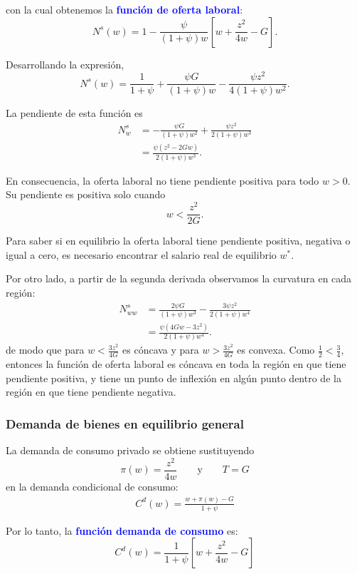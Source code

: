\documentclass[11pt]{article}
\begin{document}
con la cual obtenemos la \textcolor{blue}{\textbf{función de oferta laboral}}:
\begin{equation}
  \boxed{N^s(w) = 
  1 - 
\frac{\psi}{(1+\psi)w}\left[w+\dfrac{z^2}{4w}-G \right]}.
\end{equation}

Desarrollando la expresión,
\[
\boxed{
N^s(w)
=
\frac{1}{1+\psi}
+\frac{\psi G}{(1+\psi)w}
-\frac{\psi z^2}{4(1+\psi)w^2}
}.
\]

La pendiente de esta función es
\begin{align*}
N^s_w
&=
-\frac{\psi G}{(1+\psi)w^2}
+\frac{\psi z^2}{2(1+\psi)w^3}\\[0.3cm]
&=
\frac{\psi(z^2-2Gw)}
     {2(1+\psi)w^3}
.
\end{align*}

En consecuencia, la oferta laboral no tiene pendiente positiva para
todo \(w>0\). Su pendiente es positiva solo cuando
\[
w<\frac{z^2}{2G}.
\]

Para saber si en equilibrio la oferta laboral tiene pendiente positiva, negativa o igual a cero, es necesario encontrar el salario real de equilibrio $w^*$.

Por otro lado, a partir de la segunda derivada observamos la curvatura en cada región:
\begin{align*}
N^s_{ww}
&=
\frac{2\psi G}{(1+\psi)w^3}
-\frac{3\psi z^2}{2(1+\psi)w^4}\\[0.3cm]
&=
\frac{\psi(4Gw - 3z^2)}
     {2(1+\psi)w^4}.
\end{align*}
de modo que para $w < \tfrac{3z^2}{4G}$ es cóncava y para $w > \tfrac{3z^2}{4G}$ es convexa. Como $\tfrac{1}{2} < \tfrac{3}{4}$, entonces la función de oferta laboral es cóncava en toda la región en que tiene pendiente positiva, y tiene un punto de inflexión en algún punto dentro de la región en que tiene pendiente negativa.

\subsubsection*{Demanda de bienes en equilibrio general}

La demanda de consumo privado se obtiene sustituyendo
\[
\pi(w)=\frac{z^2}{4w}
\qquad\text{y}\qquad
T=G
\]
en la demanda condicional de consumo:
\begin{align*}
C^d(w) =
\frac{w+\pi(w)-G}{1+\psi}
\end{align*}

Por lo tanto, la \textcolor{blue}{\textbf{función demanda de consumo}} es: 
\begin{equation}
  \boxed{C^d(w) = \frac{1}{1+\psi} \left[w+\dfrac{z^2}{4w}-G \right]}
\end{equation}
\end{document}
